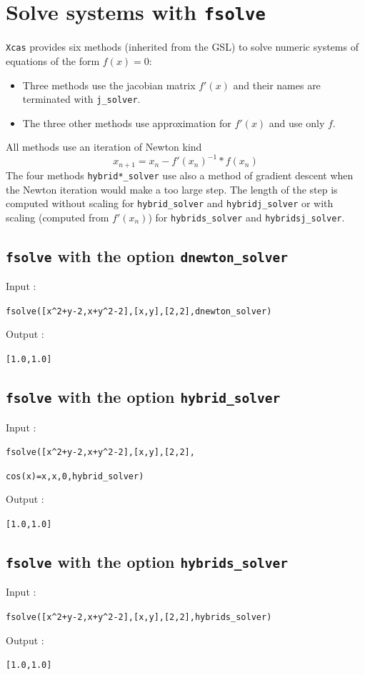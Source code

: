 \documentclass[a4paper,11pt]{book}
\begin{document}
\section{Solve systems with {\tt fsolve}}
{\tt Xcas} provides six methods (inherited from the GSL)
to solve numeric systems of equations 
of the form $f(x)=0$:
\begin{itemize}
\item Three  methods  use the jacobian matrix $f'(x)$ and their names are 
terminated with {\tt j\_solver}. 
\item
The three other  methods use approximation for $f'(x)$ and use only 
$f$.
\end{itemize}
All methods use an iteration of Newton kind
\[ x_{n+1}=x_n-{f'(x_n)}^{-1}*f(x_n) \]
The four methods {\tt hybrid*\_solver} use also a method of 
gradient descent when the Newton iteration would make a too large step.
The length of the step is computed without scaling 
for {\tt hybrid\_solver} and {\tt hybridj\_solver}
or with scaling (computed from $f'(x_n)$) for 
{\tt hybrids\_solver} and {\tt hybridsj\_solver}.

\subsection{{\tt fsolve} with the option {\tt dnewton\_solver}}
\noindent Input :
\begin{center}{\tt fsolve([x\verb|^|2+y-2,x+y\verb|^|2-2],[x,y],[2,2],dnewton\_solver)}\end{center}
Output :
\begin{center}{\tt [1.0,1.0]}\end{center}

\subsection{{\tt fsolve} with the option {\tt hybrid\_solver}}
\noindent Input :
\begin{center}{\tt fsolve([x\verb|^|2+y-2,x+y\verb|^|2-2],[x,y],[2,2],}\end{center}
\begin{center}{\tt cos(x)=x,x,0,hybrid\_solver)}\end{center}
Output :
\begin{center}{\tt [1.0,1.0]}\end{center}

\subsection{{\tt fsolve} with the option {\tt hybrids\_solver}}
\noindent Input :
\begin{center}{\tt fsolve([x\verb|^|2+y-2,x+y\verb|^|2-2],[x,y],[2,2],hybrids\_solver)}\end{center}
Output :
\begin{center}{\tt [1.0,1.0]}\end{center}
\end{document}
